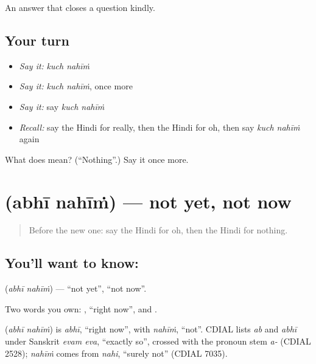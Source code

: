 \begin{grammarlens}[title={What you've built}]
An answer that closes a question kindly.
\end{grammarlens}

\subsection*{Your turn}
\begin{itemize}
\raggedright
  \item \emph{Say it:} \emph{kuch nahīṁ}
  \item \emph{Say it:} \emph{kuch nahīṁ}, once more
  \item \emph{Say it:} say \emph{kuch nahīṁ}
  \item \emph{Recall:} say the Hindi for really, then the Hindi for oh, then say \emph{kuch nahīṁ} again
\end{itemize}

\begin{tcolorbox}[breakable,colback=teal!4,colframe=teal!35!black,title={Before you move on}]
What does   mean? (\textquotedblleft{}Nothing\textquotedblright{}.) Say it once more.
\end{tcolorbox}
\section[\texorpdfstring{\hi{अभी} \hi{नहीं} (abhī nahīṁ)}{अभी नहीं (abhī nahīṁ)}]{  (abhī nahīṁ) — not yet, not now}

\label{lesson:HI-C113-abhinahin}



\begin{quote}
Before the new one: say the Hindi for oh, then the Hindi for nothing.
\end{quote}

\subsection*{You'll want to know:  }
\textbf{ } (\emph{abhī nahīṁ}) — \textquotedblleft{}not yet\textquotedblright{}, \textquotedblleft{}not now\textquotedblright{}.

Two words you own: \textbf{}, \textquotedblleft{}right now\textquotedblright{}, and \textbf{}.

\begin{cousinweb}
\textbf{ } (\emph{abhī nahīṁ}) is \emph{abhī}, \textquotedblleft{}right now\textquotedblright{}, with \emph{nahīṁ}, \textquotedblleft{}not\textquotedblright{}. CDIAL lists \emph{ab} and \emph{abhī} under Sanskrit \emph{evam eva}, \textquotedblleft{}exactly so\textquotedblright{}, crossed with the pronoun stem \emph{a-} (CDIAL 2528); \emph{nahīṁ} comes from \emph{nahi}, \textquotedblleft{}surely not\textquotedblright{} (CDIAL 7035).
\end{cousinweb}

